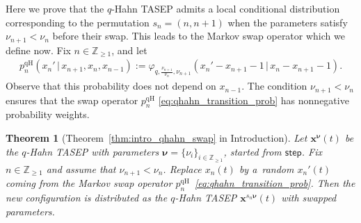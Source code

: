 \documentclass[11pt]{article}
\numberwithin{equation}{section}
\numberwithin{equation}{section}
\newtheorem{Theorem}{Theorem}[section]
\begin{document}
Here we prove that the $q$-Hahn TASEP
admits a local conditional distribution
corresponding to the permutation $s_n=(n,n+1)$
when the parameters satisfy $\nu_{n+1}<\nu_n$ before their swap.
This leads to the Markov swap operator which we define now.
Fix $n\in \mathbb{Z}_{\ge1}$,
and let
\begin{gather}
	\label{eq:qhahn_transition_prob}
	p_n^{\mathrm{qH}}
	(x_n'\,|\, x_{n+1},x_n,x_{n-1}):=
	\varphi_{q,\frac{\nu_{n+1}}{\nu_n},\nu_{n+1}}(x_n'-x_{n+1}-1\,|\, x_n-x_{n+1}-1).
\end{gather}
Observe that this probability does not depend on $x_{n-1}$.
The condition $\nu_{n+1}<\nu_n$ ensures that
the swap operator $p_n^{\mathrm{qH}}$
\eqref{eq:qhahn_transition_prob}
has nonnegative probability weights.
\begin{Theorem}[Theorem~\ref{thm:intro_qhahn_swap} in Introduction]
	\label{thm:qhahn_swap}
	Let $\mathbf{x}^{\boldsymbol\nu}(t)$ be the $q$-Hahn TASEP with parameters
	$\boldsymbol\nu=\{\nu_i\}_{i\in \mathbb{Z}_{\ge1}}$,
	started from $\mathsf{step}$.
	Fix $n\in \mathbb{Z}_{\ge1}$ and assume that
	$\nu_{n+1}<\nu_n$.
	Replace $x_n(t)$ by a~random $x_n'(t)$ coming from the Markov swap operator
	$p_n^{\mathrm{qH}}$~\eqref{eq:qhahn_transition_prob}.
	Then the new configuration is distributed as the $q$-Hahn TASEP $\mathbf{x}^{s_n \boldsymbol\nu}(t)$
	with swapped parameters.
\end{Theorem}
\end{document}
